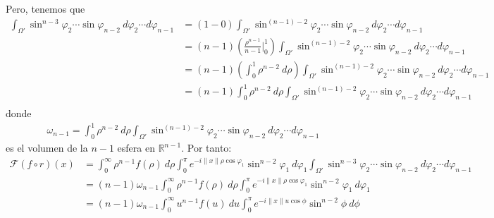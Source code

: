 \documentclass[12pt]{report}
\newcounter{it}
\theoremstyle{largebreak}
\newcommand\norm[1]{\ensuremath{\|#1\|}}
\newcommand{\fou}[1]{\ensuremath{\mathcal{F}#1}}
\begin{document}
\begin{sol}
\begin{equation*}
        \end{equation*}
        Pero, tenemos que
        \begin{equation*}
            \begin{split}
                \int_{\Omega'} \sin^{ n-3}\varphi_2\cdots\sin\varphi_{ n-2} \: d\varphi_{2}\cdots d\varphi_{ n-1}&=(1-0)\int_{\Omega'}\sin^{(n-1)-2}\varphi_2\cdots\sin\varphi_{ n-2} \: d\varphi_{2}\cdots d\varphi_{ n-1}\\
                &=(n-1)\left(\frac{\rho^{n-1}}{n-1}\Big|_{0}^1\right)\int_{\Omega'}\sin^{(n-1)-2}\varphi_2\cdots\sin\varphi_{ n-2} \: d\varphi_{2}\cdots d\varphi_{ n-1}\\
                &=(n-1)\left(\int_0^1\rho^{ n-2}\:d\rho\right)\int_{\Omega'}\sin^{(n-1)-2}\varphi_2\cdots\sin\varphi_{ n-2} \: d\varphi_{2}\cdots d\varphi_{ n-1}\\
                &=(n-1)\int_0^1\rho^{ n-2}\:d\rho\int_{\Omega'}\sin^{(n-1)-2}\varphi_2\cdots\sin\varphi_{ n-2} \: d\varphi_{2}\cdots d\varphi_{ n-1}\\
            \end{split}
        \end{equation*}
        donde
        \begin{equation*}
            \begin{split}
                \omega_{ n-1}=\int_0^1\rho^{ n-2}\:d\rho\int_{\Omega'}\sin^{(n-1)-2}\varphi_2\cdots\sin\varphi_{ n-2} \: d\varphi_{2}\cdots d\varphi_{ n-1}
            \end{split}
        \end{equation*}
        es el volumen de la $n-1$ esfera en $\mathbb{R}^{ n-1}$. Por tanto:
        \begin{equation*}
            \begin{split}
                \fou{(f\circ r)}(x)&=\int_{0}^\infty \rho^{ n-1}f(\rho)\:d\rho \int_{0}^\pi e^{ -i\norm{x}\rho\cos\varphi_1}\sin^{ n-2}\varphi_1\:d\varphi_1 \int_{\Omega'} \sin^{ n-3}\varphi_2\cdots\sin\varphi_{ n-2} \: d\varphi_{2}\cdots d\varphi_{ n-1}\\
                &=(n-1)\omega_{n-1}\int_{0}^\infty \rho^{ n-1}f(\rho)\:d\rho \int_{0}^\pi e^{ -i\norm{x}\rho\cos\varphi_1}\sin^{ n-2}\varphi_1\:d\varphi_1\\
                &=(n-1)\omega_{n-1}\int_{0}^\infty u^{ n-1}f(u)\:du \int_{0}^\pi e^{ -i\norm{x}u\cos\phi}\sin^{ n-2}\phi\:d\phi\\
            \end{split}
        \end{equation*}

\end{sol}
\end{document}

